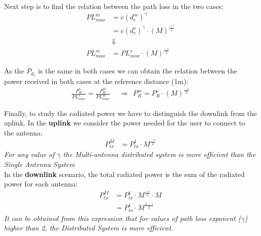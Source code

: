 Next step is to find the relation between the path loss in the two cases:
\begin{align*}
PL^m_{max} &= c(d^m_c) ^{\gamma} \\
	&= c(d^s_c)^{\gamma}\cdot (M)^{\frac{-\gamma}{2}}\\ %
&\Downarrow\\	
	PL^m_{max} &= PL^s_{max} \cdot (M)^{\frac{-\gamma}{2}}
\end{align*}

As the $P_{d_{c}}$ is the same in both cases we can obtain the relation between the power received in both cases at the reference distance (1m):
\begin{align*}
\frac{P^s_R}{PL^s_{max}}=\frac{P^m_R}{PL^m_{max}}\ \ &\Longrightarrow \ \ P^m_R = P^s_R \cdot (M)^{\frac{-\gamma}{2}}
\end{align*}

Finally, to study the radiated power we have to distinguish the downlink from the uplink. In the \textbf{uplink} we consider the power needed for the user to connect to the antenna:
\begin{align*}
P^M_{tx} &= P^1_{tx} \cdot M^{\frac{-\gamma}{2}}
\end{align*}
\textit{For any value of $\gamma$ the Multi-antenna distributed system is more efficient than the Single Antenna System}\\

In the \textbf{downlink} scenario, the total radiated power is the sum of the radiated power for each antenna:
\begin{align*}
P^M_{tx} &= P^1_{tx} \cdot M^{\frac{-\gamma}{2}} \cdot M\\
&=P^1_{tx} \cdot M^{\frac{2-\gamma}{2}}
\end{align*}
\textit{It can be obtained from this expression that for values of path loss exponent ($\gamma$) higher than 2, the Distributed System is more efficient.}